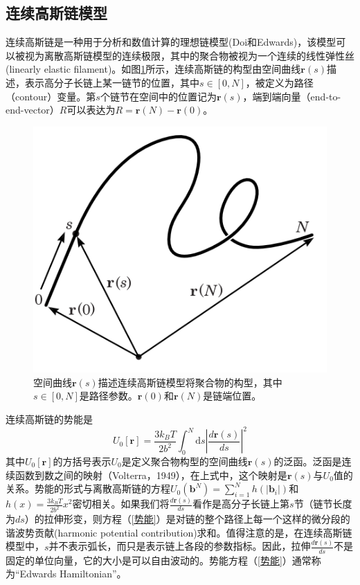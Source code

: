 \subsection{连续高斯链模型}
连续高斯链是一种用于分析和数值计算的理想链模型(Doi和Edwards)，该模型可以被视为离散高斯链模型的连续极限，其中的聚合物被视为一个连续的线性弹性丝(linearly elastic filament)。如图\ref{空间曲线描述聚合物构型}所示，连续高斯链的构型由空间曲线$\mathbf{r}(s)$描述，表示高分子长链上某一链节的位置，其中$s\in [0,N]$，被定义为路径（contour）变量。第$s$个链节在空间中的位置记为$\mathbf{r}(s)$，端到端向量（end-to-end-vector）$R$可以表达为$R=\mathbf{r}(N)−\mathbf{r}(0)$。
\begin{figure}[H]
\centering
\includegraphics[scale=0.5]{./figures/41.png}
\caption{空间曲线$\mathbf{r}(s)$描述连续高斯链模型将聚合物的构型，其中$s\in [0,N]$是路径参数。$\mathbf{r}(0)$和$\mathbf{r}(N)$是链端位置。}
\label{空间曲线描述聚合物构型}
\end{figure}

连续高斯链的势能是
\begin{equation}
U_0[\mathbf{r}]=\frac{3k_BT}{2b^2}\int_{0}^{N} \mathrm{d}s\left| \frac{d\mathbf{r}(s)}{ds} \right|^2 \label{势能}
\end{equation}
其中$U_0[\mathbf{r}]$的方括号表示$U_0$是定义聚合物构型的空间曲线$\mathbf{r}(s)$的泛函。泛函是连续函数到数之间的映射（Volterra，1949），在上式中，这个映射是$\mathbf{r}(s)$与$U_0$值的关系。势能的形式与离散高斯链的方程$U_0(\mathbf b^N)=\sum_{i=1}^{N}h(\left|\mathbf{b}_i\right|)$和$h(x)=\frac{3k_BT}{2b^2}x^2$密切相关。如果我们将$\frac{d\mathbf{r}(s)}{ds}$看作是高分子长链上第$s$节（链节长度为$ds$）的拉伸形变，则方程（\ref{势能}）是对链的整个路径上每一个这样的微分段的谐波势贡献(harmonic potential contribution)求和。值得注意的是，在连续高斯链模型中，$s$并不表示弧长，而只是表示链上各段的参数指标。因此，拉伸$\frac{d\mathbf{r}(s)}{ds}$不是固定的单位向量，它的大小是可以自由波动的。势能方程（\ref{势能}）通常称为“Edwards Hamiltonian”。

